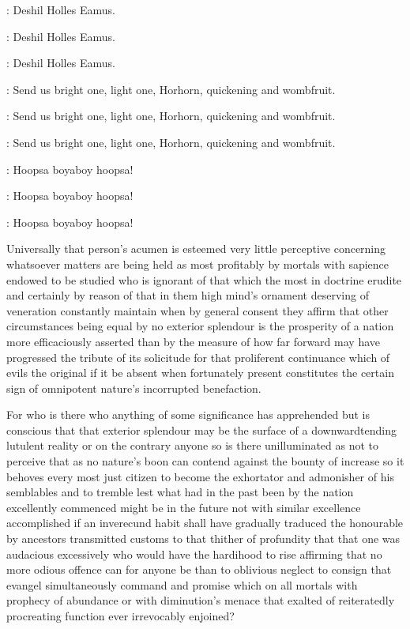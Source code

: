 \pagebreak


:
Deshil Holles Eamus.

:
Deshil Holles Eamus.

:
Deshil Holles Eamus.

:
Send us bright one,
light one,
Horhorn,
quickening and wombfruit.

:
Send us bright one,
light one,
Horhorn,
quickening and wombfruit.

:
Send us bright one,
light one,
Horhorn,
quickening and wombfruit.

\Nurses:
Hoopsa boyaboy hoopsa!

\Nurses:
Hoopsa boyaboy hoopsa!

\Nurses:
Hoopsa boyaboy hoopsa!


Universally that person's acumen is esteemed very little perceptive
concerning whatsoever matters are being held as most profitably by mortals
with sapience endowed to be studied who is ignorant of that which the most
in doctrine erudite and certainly by reason of that in them high mind's
ornament deserving of veneration constantly maintain when by general
consent they affirm that other circumstances being equal by no exterior
splendour is the prosperity of a nation more efficaciously asserted than
by the measure of how far forward may have progressed the tribute of its
solicitude for that proliferent continuance which of evils the original if
it be absent when fortunately present constitutes the certain sign of
omnipotent nature's incorrupted benefaction.

For who is there who anything
of some significance has apprehended but is conscious that that exterior
splendour may be the surface of a downwardtending lutulent reality or on
the contrary anyone so is there unilluminated as not to perceive that as
no nature's boon can contend against the bounty of increase so it behoves
every most just citizen to become the exhortator and admonisher of his
semblables and to tremble lest what had in the past been by the nation
excellently commenced might be in the future not with similar excellence
accomplished if an inverecund habit shall have gradually traduced the
honourable by ancestors transmitted customs to that thither of profundity
that that one was audacious excessively who would have the hardihood to
rise affirming that no more odious offence can for anyone be than to
oblivious neglect to consign that evangel simultaneously command and
promise which on all mortals with prophecy of abundance or with
diminution's menace that exalted of reiteratedly procreating function ever
irrevocably enjoined?

